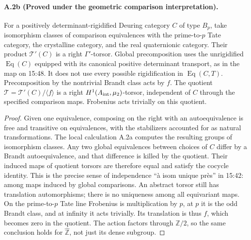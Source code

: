 \paragraph{A.2b (Proved under the geometric comparison interpretation).}
For a positively determinant-rigidified Deuring category $C$ of type
$B_p$, take isomorphism classes of comparison equivalences with the
prime-to-$p$ Tate category, the crystalline category, and the real
quaternionic category. Their product $\mathcal T'(C)$ is a right
$\Gamma'$-torsor. Global precomposition uses the unrigidified
$\operatorname{Eq}(C)$ equipped with its canonical positive
determinant transport, as in the map on 15:48. It does not use every
possible rigidification in $\operatorname{Eq}(C,T)$.
Precomposition by the nontrivial Brandt class acts
by $f$. The quotient
$\mathcal T=\mathcal T'(C)/\langle f\rangle$ is a right
$H^1(A_{\rm int},\mu_2)$-torsor, independent of $C$ through the specified
comparison maps. Frobenius acts trivially on this quotient.

\begin{proof}
Given one equivalence, composing on the right with an autoequivalence
is free and transitive on equivalences, with the stabilizers accounted
for as natural transformations. The local calculation A.2a computes
the resulting groups of isomorphism classes. Any two global equivalences
between choices of $C$ differ by a Brandt autoequivalence, and that
difference is killed by the quotient. Their induced maps of quotient
torsors are therefore equal and satisfy the cocycle identity.
This is the precise sense of independence ``à isom unique près'' in
15:42: among maps induced by global comparisons. An abstract torsor
still has translation automorphisms; there is no uniqueness among
all equivariant maps.
On the prime-to-$p$ Tate line Frobenius is multiplication by $p$, at
$p$ it is the odd Brandt class, and at infinity it acts trivially.
Its translation is thus $f$, which becomes zero in the quotient.
The action factors through $\mathbb Z/2$, so the same conclusion
holds for $\widehat{\mathbb Z}$, not just its dense subgroup.
\end{proof}


